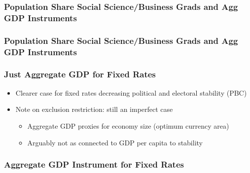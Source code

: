 \documentclass{beamer}
\begin{document}
    \begin{frame}
        \frametitle{Population Share Social Science/Business Grads and Agg GDP Instruments}
        {
            \let\oldcentering\centering
            \renewcommand\centering{\tiny\oldcentering}
            
        }
    \end{frame}

    \begin{frame}
        \frametitle{Population Share Social Science/Business Grads and Agg GDP Instruments}
        {
            \let\oldcentering\centering
            \renewcommand\centering{\tiny\oldcentering}
            
        }
    \end{frame}

    \begin{frame}
        \frametitle{Just Aggregate GDP for Fixed Rates}
        \begin{itemize}
            \item Clearer case for fixed rates decreasing political and electoral stability (PBC)
            \item Note on exclusion restriction: still an imperfect case
            \begin{itemize}
                \item Aggregate GDP proxies for economy size (optimum currency area)
                \item Arguably not as connected to GDP per capita to stability
            \end{itemize}
        \end{itemize}
    \end{frame}

    \begin{frame}
        \frametitle{Aggregate GDP Instrument for Fixed Rates}
        {
            \let\oldcentering\centering
            \renewcommand\centering{\tiny\oldcentering}
            
        }
    \end{frame}
\end{document}
